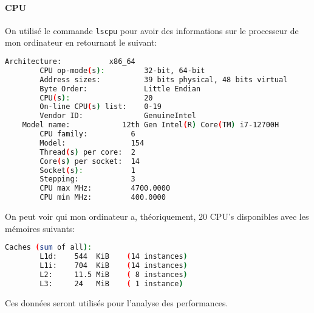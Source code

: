 \documentclass{article}
\begin{document}
\paragraph{CPU}On utilisé le commande \texttt{lscpu} pour avoir des informations sur le processeur de mon ordinateur en retournant le suivant:
\begin{scriptsize}
    \mycode
    \begin{lstlisting}[language=bash]
    Architecture:           x86_64
        CPU op-mode(s):         32-bit, 64-bit
        Address sizes:          39 bits physical, 48 bits virtual
        Byte Order:             Little Endian
        CPU(s):                 20
        On-line CPU(s) list:    0-19
        Vendor ID:              GenuineIntel
    Model name:            12th Gen Intel(R) Core(TM) i7-12700H
        CPU family:          6
        Model:               154
        Thread(s) per core:  2
        Core(s) per socket:  14
        Socket(s):           1
        Stepping:            3
        CPU max MHz:         4700.0000
        CPU min MHz:         400.0000
    \end{lstlisting}
\end{scriptsize}
On peut voir qui mon ordinateur a, théoriquement, 20 CPU's disponibles avec les mémoires suivants:
\begin{scriptsize}
    \mycode
    \begin{lstlisting}[language=bash]
    Caches (sum of all):     
        L1d:    544  KiB    (14 instances)
        L1i:    704  KiB    (14 instances)
        L2:     11.5 MiB    ( 8 instances)
        L3:     24   MiB    ( 1 instance)
    \end{lstlisting}
\end{scriptsize}
Ces données seront utilisés pour l'analyse des performances.




\end{document}
